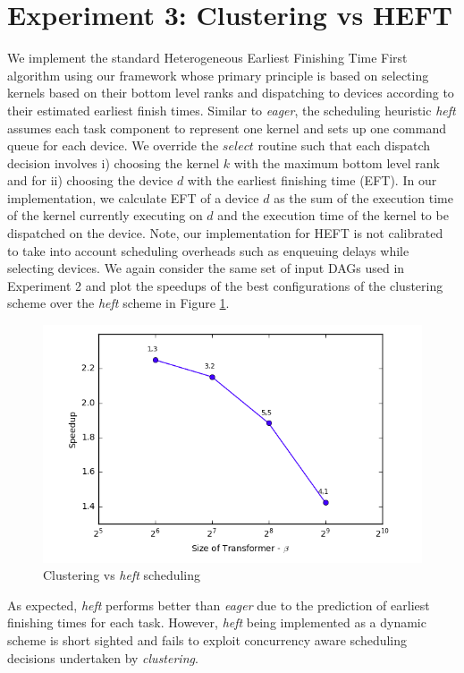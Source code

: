 	\section{Experiment 3: Clustering vs HEFT}
	We implement the standard Heterogeneous Earliest Finishing Time First algorithm using our framework whose primary principle is based on selecting kernels based on their bottom level ranks and dispatching to devices according to their estimated earliest finish times. Similar to {\em eager}, the scheduling heuristic {\em heft} assumes each task component to represent one kernel and sets up one command queue for each device. We override the $select$ routine such that each dispatch decision involves i) choosing the kernel $k$ with the maximum bottom level rank and for ii) choosing the device $d$ with the earliest finishing time (EFT). In our implementation, we calculate EFT of a device $d$ as the sum of the execution time of the kernel currently executing on $d$ and the execution time of the kernel to be dispatched on the device. Note, our implementation for HEFT is not calibrated to take into account scheduling overheads such as enqueuing delays while selecting devices. We again consider the same set of input DAGs used in Experiment 2 and plot the speedups of the best configurations of the clustering scheme over the {\em heft} scheme in  Figure \ref{fig:Expt3}.
	\begin{figure}[ht]
		\centering
		\includegraphics[scale=0.45]{Pictures/Expt-3.png}
		\caption{\small Clustering vs {\em heft} scheduling \label{fig:Expt3}}
	\end{figure}
	\par As expected, {\em heft} performs better than {\em eager} due to the prediction of earliest finishing times for each task.  However, {\em heft} being implemented as a dynamic scheme is short sighted and fails to exploit concurrency aware scheduling decisions undertaken by {\em clustering}. 
